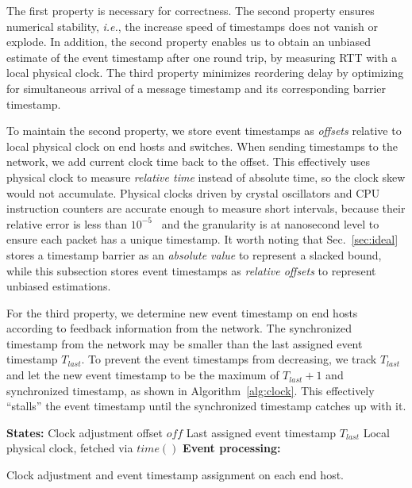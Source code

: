 The first property is necessary for correctness. The second property ensures numerical stability, \textit{i.e.}, the increase speed of timestamps does not vanish or explode. In addition, the second property enables us to obtain an unbiased estimate of the event timestamp after one round trip, by measuring RTT with a local physical clock. The third property minimizes reordering delay by optimizing for simultaneous arrival of a message timestamp and its corresponding barrier timestamp.

To maintain the second property, we store event timestamps as \textit{offsets} relative to local physical clock on end hosts and switches. When sending timestamps to the network, we add current clock time back to the offset.
This effectively uses physical clock to measure \textit{relative time} instead of absolute time, so the clock skew would not accumulate. Physical clocks driven by crystal oscillators and CPU instruction counters are accurate enough to measure short intervals, because their relative error is less than $10^{-5}$~\cite{corbett2013spanner} and the granularity is at nanosecond level to ensure each packet has a unique timestamp.
It worth noting that Sec.~\ref{sec:ideal} stores a timestamp barrier as an \textit{absolute value} to represent a slacked bound, while this subsection stores event timestamps as \textit{relative offsets} to represent unbiased estimations.

For the third property, we determine new event timestamp on end hosts according to feedback information from the network.
The synchronized timestamp from the network may be smaller than the last assigned event timestamp $T_{last}$. To prevent the event timestamps from decreasing, we track $T_{last}$ and let the new event timestamp to be the maximum of $T_{last} + 1$ and synchronized timestamp, as shown in Algorithm~\ref{alg:clock}. This effectively ``stalls'' the event timestamp until the synchronized timestamp catches up with it.

\begin{algorithm}[t]
 \DontPrintSemicolon
 \textbf{States:} Clock adjustment offset $off$\;
 \qquad Last assigned event timestamp $T_{last}$\;
 \qquad Local physical clock, fetched via $time()$\;
 \textbf{Event processing:}\;
 \caption{Clock adjustment and event timestamp assignment on each end host.}
 \label{alg:clock}
\end{algorithm}


